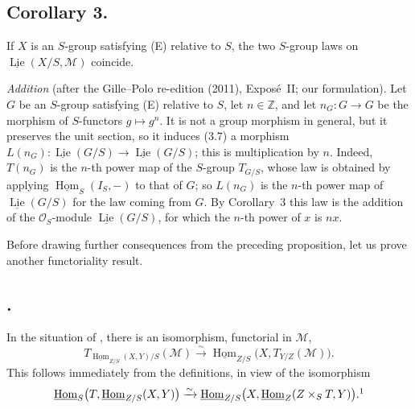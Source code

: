 \subsection*{Corollary 3.}
If \(X\) is an \(S\)-group satisfying (E) relative to \(S\), the two
\(S\)-group laws on
\(\underline{\operatorname{Lie}}(X/S,\mathcal M)\) coincide.

\par\medskip\noindent
{}%
\emph{Addition} (after the Gille--Polo re-edition (2011), Expos\'e~II; our
formulation). Let \(G\) be an \(S\)-group satisfying (E) relative to \(S\),
let \(n\in\mathbb Z\), and let \(n_G\colon G\to G\) be the morphism of
\(S\)-functors \(g\mapsto g^n\). It is not a group morphism in general, but
it preserves the unit section, so it induces (3.7) a morphism
\(L(n_G)\colon\underline{\operatorname{Lie}}(G/S)\to
\underline{\operatorname{Lie}}(G/S)\); this is multiplication by \(n\).
Indeed, \(T(n_G)\) is the \(n\)-th power map of the \(S\)-group
\(T_{G/S}\), whose law is obtained by applying
\(\underline{\operatorname{Hom}}_S(I_S,-)\) to that of \(G\); so
\(L(n_G)\) is the \(n\)-th power map of
\(\underline{\operatorname{Lie}}(G/S)\) for the law coming from \(G\). By
Corollary~3 this law is the addition of the \(\mathcal O_S\)-module
\(\underline{\operatorname{Lie}}(G/S)\), for which the \(n\)-th power of
\(x\) is \(nx\).
\par\medskip

Before drawing further consequences from the preceding proposition, let
us prove another functoriality result.

\subsection*{.}
In the situation of , there is an isomorphism, functorial in
\(\mathcal M\),
\[
  T_{\underline{\operatorname{Hom}}_{Z/S}(X,Y)/S}(\mathcal M)
  \xrightarrow{\sim}
  \underline{\operatorname{Hom}}_{Z/S}
    \bigl(X,T_{Y/Z}(\mathcal M)\bigr).
\]
This follows immediately from the definitions, in view of the isomorphism
\[
  \underline{\operatorname{Hom}}_S
    \bigl(T,\underline{\operatorname{Hom}}_{Z/S}(X,Y)\bigr)
  \xrightarrow{\sim}
  \underline{\operatorname{Hom}}_{Z/S}
    \bigl(X,\underline{\operatorname{Hom}}_Z(Z\times_ST,Y)\bigr).\footnotemark
\]

